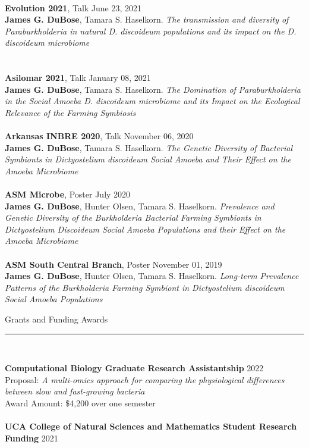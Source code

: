 \documentclass{article}
\begin{document}
\\
\textbf{Evolution 2021}, Talk \hfill June 23, 2021\\
\textbf{James G. DuBose}, Tamara S. Haselkorn. \emph{The transmission and diversity of Paraburkholderia in natural D. discoideum populations and its impact on the D. discoideum microbiome}\\
\\
\\
\textbf{Asilomar 2021}, Talk \hfill January 08, 2021\\
\textbf{James G. DuBose}, Tamara S. Haselkorn. \emph{The Domination of Paraburkholderia in the Social Amoeba D. discoideum microbiome and its Impact on the Ecological Relevance of the Farming Symbiosis}\\
\\
\textbf{Arkansas INBRE 2020}, Talk \hfill November 06, 2020\\
\textbf{James G. DuBose}, Tamara S. Haselkorn. \emph{The Genetic Diversity of Bacterial Symbionts in Dictyostelium discoideum Social Amoeba and Their Effect on the Amoeba Microbiome}\\
\\
\textbf{ASM Microbe}, Poster \hfill July 2020\\
\textbf{James G. DuBose}, Hunter Olsen, Tamara S. Haselkorn. \emph{Prevalence and Genetic Diversity
of the Burkholderia Bacterial Farming Symbionts in Dictyostelium Discoideum Social Amoeba Populations and their Effect on the Amoeba Microbiome}\\
\\
\textbf{ASM South Central Branch}, Poster \hfill November 01, 2019\\
\textbf{James G. DuBose}, Hunter Olsen, Tamara S. Haselkorn. \emph{Long-term Prevalence Patterns of the Burkholderia Farming Symbiont in Dictyostelium discoideum Social Amoeba Populations}
\\
\begin{flushleft}
{\Large Grants and Funding Awards} \rule{16.51cm}{0.4pt}\\
\end{flushleft}
\textbf{Computational Biology Graduate Research Assistantship} \hfill 2022\\
Proposal: \emph{A multi-omics approach for comparing the physiological differences between slow and fast-growing bacteria}\\
Award Amount: \$4,200 over one semester\\
\\
\textbf{UCA College of Natural Sciences and Mathematics Student Research Funding} \hfill 2021\\
\end{document}
